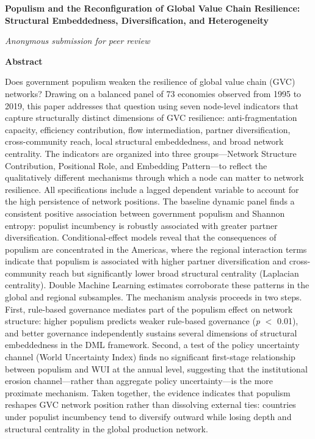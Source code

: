 \documentclass[12pt]{article}
\begin{document}

\begin{titlepage}
\begin{center}
\vspace*{2cm}
{\Large \textbf{Populism and the Reconfiguration of Global Value Chain Resilience: \\[0.5em]
Structural Embeddedness, Diversification, and Heterogeneity}}

\vspace{2cm}
{\normalsize \textit{Anonymous submission for peer review}}

\vspace{3cm}
\textbf{Abstract}
\end{center}

\noindent
Does government populism weaken the resilience of global value chain (GVC) networks? Drawing on a balanced panel of 73 economies observed from 1995 to 2019, this paper addresses that question using seven node-level indicators that capture structurally distinct dimensions of GVC resilience: anti-fragmentation capacity, efficiency contribution, flow intermediation, partner diversification, cross-community reach, local structural embeddedness, and broad network centrality. The indicators are organized into three groups---Network Structure Contribution, Positional Role, and Embedding Pattern---to reflect the qualitatively different mechanisms through which a node can matter to network resilience. All specifications include a lagged dependent variable to account for the high persistence of network positions. The baseline dynamic panel finds a consistent positive association between government populism and Shannon entropy: populist incumbency is robustly associated with greater partner diversification. Conditional-effect models reveal that the consequences of populism are concentrated in the Americas, where the regional interaction terms indicate that populism is associated with higher partner diversification and cross-community reach but significantly lower broad structural centrality (Laplacian centrality). Double Machine Learning estimates corroborate these patterns in the global and regional subsamples. The mechanism analysis proceeds in two steps. First, rule-based governance mediates part of the populism effect on network structure: higher populism predicts weaker rule-based governance (\textit{p} $<$ 0.01), and better governance independently sustains several dimensions of structural embeddedness in the DML framework. Second, a test of the policy uncertainty channel (World Uncertainty Index) finds no significant first-stage relationship between populism and WUI at the annual level, suggesting that the institutional erosion channel---rather than aggregate policy uncertainty---is the more proximate mechanism. Taken together, the evidence indicates that populism reshapes GVC network position rather than dissolving external ties: countries under populist incumbency tend to diversify outward while losing depth and structural centrality in the global production network.


\end{titlepage}
\end{document}

